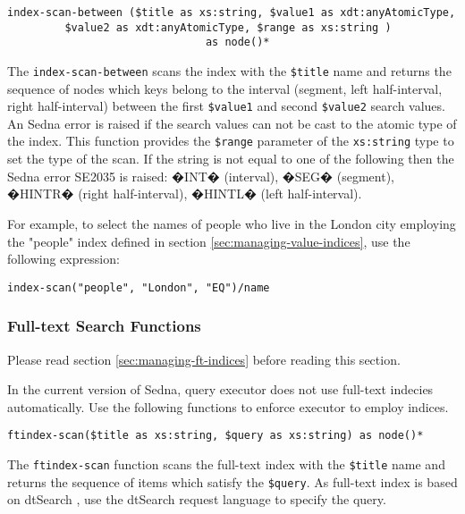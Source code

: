 \documentclass[a4paper,12pt]{article}
\begin{document}
\begin{verbatim}
index-scan-between ($title as xs:string, $value1 as xdt:anyAtomicType,
         $value2 as xdt:anyAtomicType, $range as xs:string )
                               as node()*
\end{verbatim}

The \verb!index-scan-between! scans the index with the \verb!$title! name and returns the sequence of nodes which keys belong to the interval (segment, left half-interval, right half-interval) between the first \verb!$value1! and second \verb!$value2! search values. An Sedna error is raised if the search values can not be cast to the atomic type of the index. This function provides the \verb!$range! parameter of the \verb!xs:string! type to set the type of the scan. If the string is not equal to one of the following then the Sedna error SE2035 is raised: �INT� (interval), �SEG� (segment), �HINTR� (right half-interval), �HINTL� (left half-interval).

For example, to select the names of people who live in the London city employing the "people" index defined in section \ref{sec:managing-value-indices}, use the following expression:
\begin{verbatim}
index-scan("people", "London", "EQ")/name
\end{verbatim}




\subsubsection{Full-text Search Functions}
\label{sec:ft-fun}
Please read section \ref{sec:managing-ft-indices} before reading this section.

In the current version of Sedna, query executor does not use full-text indecies automatically. Use the following functions
to enforce executor to employ indices.

\begin{verbatim}
ftindex-scan($title as xs:string, $query as xs:string) as node()*
\end{verbatim}

The \verb!ftindex-scan! function scans the full-text index with the \verb!$title! name and returns the sequence of items which satisfy the \verb!$query!. As full-text index is based on dtSearch \cite{link:dtsearch-engine}, use the dtSearch request language \cite{doc:dtsearch} to specify the query.
\end{document}

